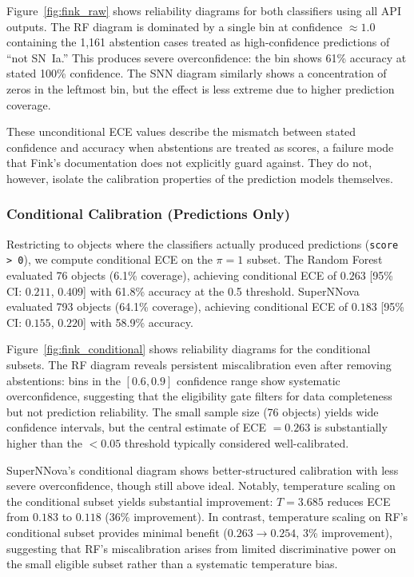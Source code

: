 \documentclass[twocolumn]{aastex631}
\begin{document}
Figure~\ref{fig:fink_raw} shows reliability diagrams for both classifiers using all API outputs. The RF diagram is dominated by a single bin at confidence $\approx 1.0$ containing the 1,161 abstention cases treated as high-confidence predictions of ``not SN~Ia.'' This produces severe overconfidence: the bin shows 61\% accuracy at stated 100\% confidence. The SNN diagram similarly shows a concentration of zeros in the leftmost bin, but the effect is less extreme due to higher prediction coverage.

These unconditional ECE values describe the mismatch between stated confidence and accuracy when abstentions are treated as scores, a failure mode that Fink's documentation does not explicitly guard against. They do not, however, isolate the calibration properties of the prediction models themselves.

\subsubsection{Conditional Calibration (Predictions Only)}

Restricting to objects where the classifiers actually produced predictions (\texttt{score > 0}), we compute conditional ECE on the $\pi = 1$ subset. The Random Forest evaluated 76 objects (6.1\% coverage), achieving conditional ECE of $0.263$ [95\% CI: $0.211$, $0.409$] with 61.8\% accuracy at the 0.5 threshold. SuperNNova evaluated 793 objects (64.1\% coverage), achieving conditional ECE of $0.183$ [95\% CI: $0.155$, $0.220$] with 58.9\% accuracy.

Figure~\ref{fig:fink_conditional} shows reliability diagrams for the conditional subsets. The RF diagram reveals persistent miscalibration even after removing abstentions: bins in the $[0.6, 0.9]$ confidence range show systematic overconfidence, suggesting that the eligibility gate filters for data completeness but not prediction reliability. The small sample size (76 objects) yields wide confidence intervals, but the central estimate of ECE $= 0.263$ is substantially higher than the $< 0.05$ threshold typically considered well-calibrated.

SuperNNova's conditional diagram shows better-structured calibration with less severe overconfidence, though still above ideal. Notably, temperature scaling on the conditional subset yields substantial improvement: $T = 3.685$ reduces ECE from $0.183$ to $0.118$ (36\% improvement). In contrast, temperature scaling on RF's conditional subset provides minimal benefit ($0.263 \to 0.254$, 3\% improvement), suggesting that RF's miscalibration arises from limited discriminative power on the small eligible subset rather than a systematic temperature bias.
\end{document}
